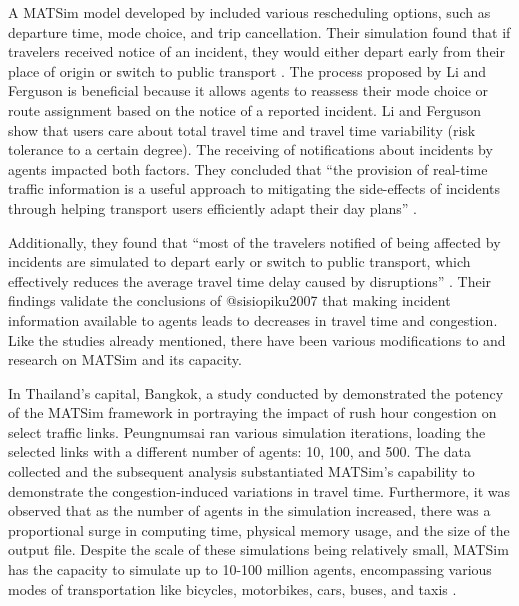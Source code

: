 \documentclass[
  letterpaper,
  authoryear]{elsarticle}
\begin{document}
A MATSim model developed by \citet{li2020} included various rescheduling
options, such as departure time, mode choice, and trip cancellation.
Their simulation found that if travelers received notice of an incident,
they would either depart early from their place of origin or switch to
public transport \citep{li2020}. The process proposed by Li and Ferguson
is beneficial because it allows agents to reassess their mode choice or
route assignment based on the notice of a reported incident. Li and
Ferguson show that users care about total travel time and travel time
variability (risk tolerance to a certain degree). The receiving of
notifications about incidents by agents impacted both factors. They
concluded that ``the provision of real-time traffic information is a
useful approach to mitigating the side-effects of incidents through
helping transport users efficiently adapt their day plans'' \citep[
p.96]{li2020}.

Additionally, they found that ``most of the travelers notified of being
affected by incidents are simulated to depart early or switch to public
transport, which effectively reduces the average travel time delay
caused by disruptions'' \citep[ p.96]{li2020}. Their findings validate
the conclusions of @sisiopiku2007 that making incident information
available to agents leads to decreases in travel time and congestion.
Like the studies already mentioned, there have been various
modifications to and research on MATSim and its capacity.

In Thailand's capital, Bangkok, a study conducted by
\citet{peungnumsai2019} demonstrated the potency of the MATSim framework
in portraying the impact of rush hour congestion on select traffic
links. Peungnumsai ran various simulation iterations, loading the
selected links with a different number of agents: 10, 100, and 500. The
data collected and the subsequent analysis substantiated MATSim's
capability to demonstrate the congestion-induced variations in travel
time. Furthermore, it was observed that as the number of agents in the
simulation increased, there was a proportional surge in computing time,
physical memory usage, and the size of the output file. Despite the
scale of these simulations being relatively small, MATSim has the
capacity to simulate up to 10-100 million agents, encompassing various
modes of transportation like bicycles, motorbikes, cars, buses, and
taxis \citep{peungnumsai2019}.
\end{document}
